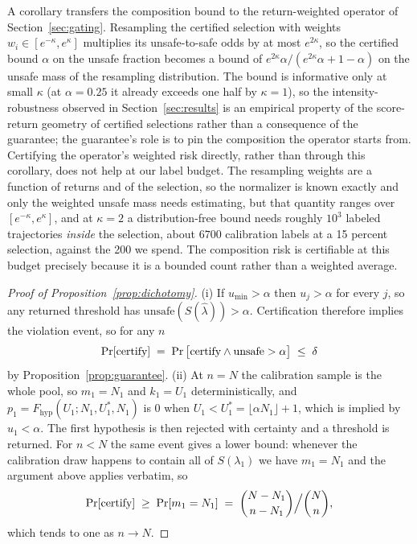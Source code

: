 \documentclass{article} %
\begin{document}
A corollary transfers the composition bound to the return-weighted operator of Section~\ref{sec:gating}. Resampling the certified selection with weights $w_i \in [e^{-\kappa}, e^{\kappa}]$ multiplies its unsafe-to-safe odds by at most $e^{2\kappa}$, so the certified bound $\alpha$ on the unsafe fraction becomes a bound of $e^{2\kappa}\alpha / (e^{2\kappa}\alpha + 1 - \alpha)$ on the unsafe mass of the resampling distribution. The bound is informative only at small $\kappa$ (at $\alpha = 0.25$ it already exceeds one half by $\kappa = 1$), so the intensity-robustness observed in Section~\ref{sec:results} is an empirical property of the score-return geometry of certified selections rather than a consequence of the guarantee; the guarantee's role is to pin the composition the operator starts from. Certifying the operator's weighted risk directly, rather than through this corollary, does not help at our label budget. The resampling weights are a function of returns and of the selection, so the normalizer is known exactly and only the weighted unsafe mass needs estimating, but that quantity ranges over $[e^{-\kappa}, e^{\kappa}]$, and at $\kappa = 2$ a distribution-free bound needs roughly $10^3$ labeled trajectories \emph{inside} the selection, about $6700$ calibration labels at a 15 percent selection, against the 200 we spend. The composition risk is certifiable at this budget precisely because it is a bounded count rather than a weighted average.

\begin{proof}[Proof of Proposition~\ref{prop:dichotomy}]
(i) If $u_{\min} > \alpha$ then $u_j > \alpha$ for every $j$, so any returned threshold has $\mathrm{unsafe}(S(\hat\lambda)) > \alpha$. Certification therefore implies the violation event, so for any $n$
\[
  \Pr[\textnormal{certify}]
  \;=\; \Pr\big[\textnormal{certify} \wedge \mathrm{unsafe} > \alpha\big]
  \;\le\; \delta
\]
by Proposition~\ref{prop:guarantee}. (ii) At $n = N$ the calibration sample is the whole pool, so $m_1 = N_1$ and $k_1 = U_1$ deterministically, and $p_1 = F_{\mathrm{hyp}}(U_1; N_1, U_1^{*}, N_1)$ is $0$ when $U_1 < U_1^{*} = \lfloor \alpha N_1 \rfloor + 1$, which is implied by $u_1 < \alpha$. The first hypothesis is then rejected with certainty and a threshold is returned. For $n < N$ the same event gives a lower bound: whenever the calibration draw happens to contain all of $S(\lambda_1)$ we have $m_1 = N_1$ and the argument above applies verbatim, so
\[
  \Pr[\textnormal{certify}] \;\ge\; \Pr[m_1 = N_1] \;=\; \binom{N - N_1}{n - N_1} \Big/ \binom{N}{n},
\]
which tends to one as $n \to N$.
\end{proof}
\end{document}
